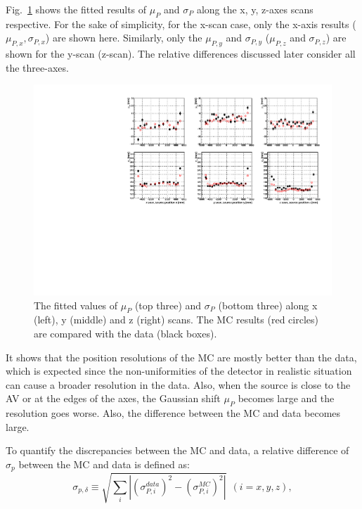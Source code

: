 Fig.~\ref{MPWscanXYZResols} shows the fitted results of $\mu_P$ and $\sigma_P$ along the x, y, z-axes scans respective. For the sake of simplicity, for the x-scan case, only the x-axis results ($\mu_{P,x},\sigma_{P,x}$) are shown here. Similarly, only the $\mu_{P,y}$ and $\sigma_{P,y}$ ($\mu_{P,z}$ and $\sigma_{P,z}$) are shown for the y-scan (z-scan). The relative differences discussed later consider all the three-axes.

\begin{figure}
	\centering
	\includegraphics[width=16cm]{N16_rat6176_muPandSigmaP_xyzScans.pdf}
	\caption{The fitted values of $\mu_P$ (top three) and $\sigma_P$ (bottom three) along x (left), y (middle) and z (right) scans. The MC results (red circles) are compared with the data (black boxes).}
	\label{MPWscanXYZResols}
\end{figure}

It shows that the position resolutions of the MC are mostly better than the data, which is expected since the non-uniformities of the detector in realistic situation can cause a broader resolution in the data\cite{waterunidoc}. Also, when the source is close to the AV or at the edges of the axes, the Gaussian shift $\mu_P$ becomes large and the resolution goes worse. Also, the difference between the MC and data becomes large.

To quantify the discrepancies between the MC and data, a relative difference of $\sigma_p$ between the MC and data is defined as\cite{waterunidoc}:
\begin{equation}
\sigma_{p,\delta}\equiv\sqrt{\sum_i|(\sigma^{data}_{P,i})^2-(\sigma^{MC}_{P,i})^2|}~~(i=x,y,z),
\end{equation}
 
